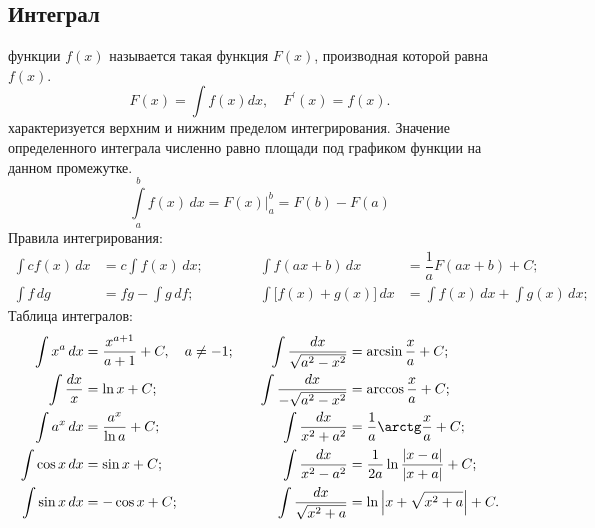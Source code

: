 \subsection{Интеграл}
 функции $f(x)$ называется такая функция $F(x)$, производная которой равна $f(x)$.
\begin{equation}
F(x) = \int f(x)dx,\quad F^\prime(x)=f(x).
\end{equation}
 характеризуется верхним и нижним пределом интегрирования. Значение определенного интеграла численно равно площади под графиком функции на данном промежутке.
\begin{equation}
\int\limits^b_a f(x)\,dx = F(x) \biggr|^b_a = F(b) - F(a)
\end{equation}
Правила интегрирования:
\begin{align*}	
\int c f(x) \,dx &= c \int f(x) \,dx;  &&&&&\int f(ax + b) \,dx &= \dfrac{1}{a}F(ax + b) + C;\\
\int f \,dg &= fg - \int g \,df; &&&&& \int \bigl[f(x) + g(x)\bigr] \,dx &= \int f(x) \,dx + \int g(x) \,dx;
\end{align*}
Таблица интегралов:
\begin{align*}
\int  x^a \,dx &= \dfrac{x^{a+1}}{a+1} + C,\quad a \neq -1;\quad & 
\int \dfrac{dx}{\sqrt{a^2 - x^2}} &= \arcsin\dfrac{x}{a} + C;\\
\int \frac{dx}{x} &= \ln x + C; &
\int \dfrac{dx}{-\sqrt{a^2 - x^2}} &= \arccos\dfrac{x}{a} + C;\\
\int a^x \,dx &= \dfrac{a^x}{\ln a} + C; & 
\int \dfrac{dx}{x^2 + a^2} &= \dfrac{1}{a} \arctg \dfrac{x}{a} + C; \\
\int \cos x \,dx &= \sin x + C; & 
\int \dfrac{dx}{x^2 - a^2} &= \dfrac{1}{2a} \ln \dfrac{|x - a|}{|x + a|} + C;\\
\int \sin x \,dx &= -\cos x + C; &
\int \dfrac{dx}{\sqrt{x^2 + a}} &= \ln \left| x + \sqrt{x^2 + a} \right| + C.
\end{align*}